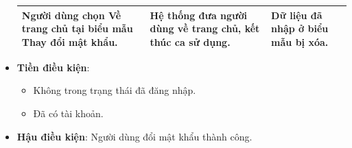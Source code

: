 \documentclass[./../main.tex]{subfiles}
\begin{document}
\begin{itemize}
\begin{table}[H]
\begin{tabularx}{\textwidth}{| X | X | X |}
            Người dùng chọn Về trang chủ tại biểu mẫu Thay đổi mật khẩu. & Hệ thống đưa người dùng về trang chủ, kết thúc ca sử dụng. & Dữ liệu đã nhập ở biểu mẫu bị xóa.
            \\ \hline
        \end{tabularx}
        \end{table}
    \item \textbf{Tiền điều kiện}:
        \begin{itemize}
            \item{Không trong trạng thái đã đăng nhập.\\}
            \item{Đã có tài khoản.}
        \end{itemize}
    \item \textbf{Hậu điều kiện}: Người dùng đổi mật khẩu thành công.
\end{itemize}
\end{document}
